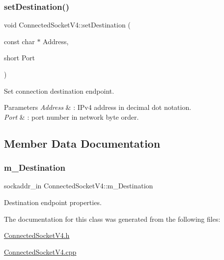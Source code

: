 \subsubsection{\texorpdfstring{set\+Destination()}{setDestination()}\hspace{0.1cm}{\footnotesize\ttfamily [3/3]}}
{\footnotesize\ttfamily void Connected\+Socket\+V4\+::set\+Destination (\begin{DoxyParamCaption}\item[{const char $\ast$}]{Address,  }\item[{short}]{Port }\end{DoxyParamCaption})}

Set connection destination endpoint. 
\begin{DoxyParams}{Parameters}
{\em Address} & \+: I\+Pv4 address in decimal dot notation. \\
\hline
{\em Port} & \+: port number in network byte order. \\
\hline
\end{DoxyParams}


\subsection{Member Data Documentation}
\mbox{\label{classConnectedSocketV4_ab07c2124a1a10a7f402bba27e457d15d}} 
\subsubsection{\texorpdfstring{m\+\_\+\+Destination}{m\_Destination}}
{\footnotesize\ttfamily sockaddr\+\_\+in Connected\+Socket\+V4\+::m\+\_\+\+Destination\hspace{0.3cm}{\ttfamily [protected]}}



Destination endpoint properties. 



The documentation for this class was generated from the following files\+:\begin{DoxyCompactItemize}
\item 
\hyperlink{ConnectedSocketV4_8h}{Connected\+Socket\+V4.\+h}\item 
\hyperlink{ConnectedSocketV4_8cpp}{Connected\+Socket\+V4.\+cpp}\end{DoxyCompactItemize}
